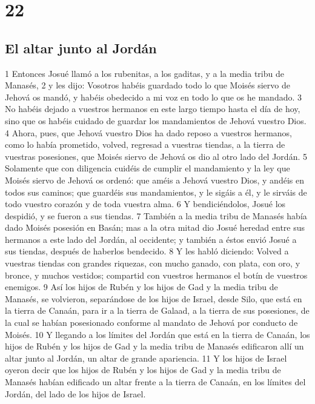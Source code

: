 \chapter{22}

\section*{El altar junto al Jordán}

1 Entonces Josué llamó a los rubenitas, a los gaditas, y a la media tribu de Manasés,
2 y les dijo: Vosotros habéis guardado todo lo que Moisés siervo de Jehová os mandó, y habéis obedecido a mi voz en todo lo que os he mandado. 
3 No habéis dejado a vuestros hermanos en este largo tiempo hasta el día de hoy, sino que os habéis cuidado de guardar los mandamientos de Jehová vuestro Dios.
4 Ahora, pues, que Jehová vuestro Dios ha dado reposo a vuestros hermanos, como lo había prometido, volved, regresad a vuestras tiendas, a la tierra de vuestras posesiones, que Moisés siervo de Jehová os dio al otro lado del Jordán.
5 Solamente que con diligencia cuidéis de cumplir el mandamiento y la ley que Moisés siervo de Jehová os ordenó: que améis a Jehová vuestro Dios, y andéis en todos sus caminos; que guardéis sus mandamientos, y le sigáis a él, y le sirváis de todo vuestro corazón y de toda vuestra alma.
6 Y bendiciéndolos, Josué los despidió, y se fueron a sus tiendas.
7 También a la media tribu de Manasés había dado Moisés posesión en Basán; mas a la otra mitad dio Josué heredad entre sus hermanos a este lado del Jordán, al occidente; y también a éstos envió Josué a sus tiendas, después de haberlos bendecido.
8 Y les habló diciendo: Volved a vuestras tiendas con grandes riquezas, con mucho ganado, con plata, con oro, y bronce, y muchos vestidos; compartid con vuestros hermanos el botín de vuestros enemigos.
9 Así los hijos de Rubén y los hijos de Gad y la media tribu de Manasés, se volvieron, separándose de los hijos de Israel, desde Silo, que está en la tierra de Canaán, para ir a la tierra de Galaad, a la tierra de sus posesiones, de la cual se habían posesionado conforme al mandato de Jehová por conducto de Moisés.
10 Y llegando a los límites del Jordán que está en la tierra de Canaán, los hijos de Rubén y los hijos de Gad y la media tribu de Manasés edificaron allí un altar junto al Jordán, un altar de grande apariencia.
11 Y los hijos de Israel oyeron decir que los hijos de Rubén y los hijos de Gad y la media tribu de Manasés habían edificado un altar frente a la tierra de Canaán, en los límites del Jordán, del lado de los hijos de Israel.
